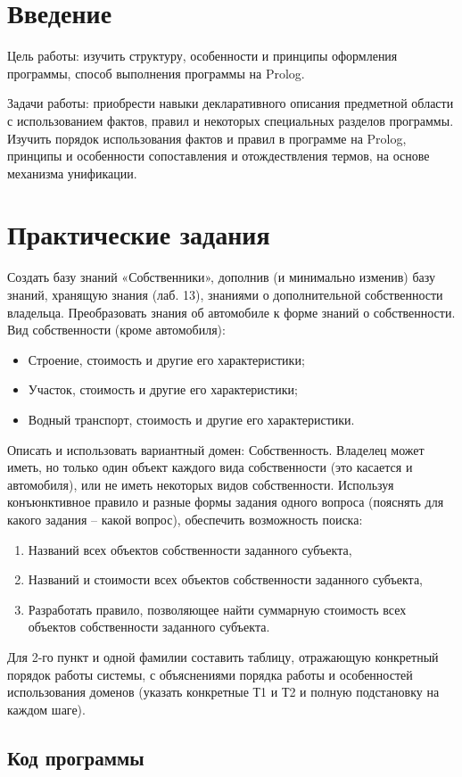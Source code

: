 \documentclass[a4paper, 14pt, unknownkeysallowed]{extreport}
\begin{document}

\setcounter{page}{2}

\chapter*{Введение}
Цель работы: изучить структуру, особенности и принципы оформления
программы, способ выполнения программы на Prolog.

Задачи работы: приобрести навыки декларативного описания предметной области с
использованием фактов, правил и некоторых специальных разделов программы.
Изучить порядок использования фактов и правил в программе на Prolog, принципы и
особенности сопоставления и отождествления термов, на основе механизма унификации.

\chapter{Практические задания}
Создать базу знаний «Собственники», дополнив (и минимально изменив) базу
знаний, хранящую знания (лаб. 13), знаниями о дополнительной собственности владельца. Преобразовать знания об автомобиле к форме знаний о собственности. 
Вид собственности (кроме автомобиля):
\begin{itemize}
\item Строение, стоимость и другие его характеристики;
\item Участок, стоимость и другие его характеристики;
\item Водный транспорт, стоимость и другие его характеристики.
\end{itemize}
Описать и использовать вариантный домен: Собственность. Владелец может иметь, но 
только один объект каждого вида собственности (это касается и автомобиля), или не 
иметь некоторых видов собственности. 
Используя конъюнктивное правило и разные формы задания одного вопроса (пояснять 
для какого задания – какой вопрос), 
обеспечить возможность поиска:
\begin{enumerate}
\item Названий всех объектов собственности заданного субъекта,
\item Названий и стоимости всех объектов собственности заданного субъекта,
\item Разработать правило, позволяющее найти суммарную стоимость всех 
объектов собственности заданного субъекта.
\end{enumerate}
Для 2-го пункт и одной фамилии составить таблицу, отражающую конкретный 
порядок работы системы, с объяснениями порядка работы и особенностей использования 
доменов (указать конкретные Т1 и Т2 и полную подстановку на каждом шаге).

\clearpage
\section{Код программы}
\clearpage

\end{document}
